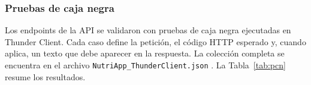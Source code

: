 \subsubsection{Pruebas de caja negra}

Los endpoints de la API se validaron con pruebas de caja negra ejecutadas en
Thunder Client. Cada caso define la petición, el código HTTP esperado y, cuando
aplica, un texto que debe aparecer en la respuesta. La colección completa se
encuentra en el archivo \texttt{NutriApp\_ThunderClient.json}
. La Tabla~\ref{tab:pcn} resume los resultados.


